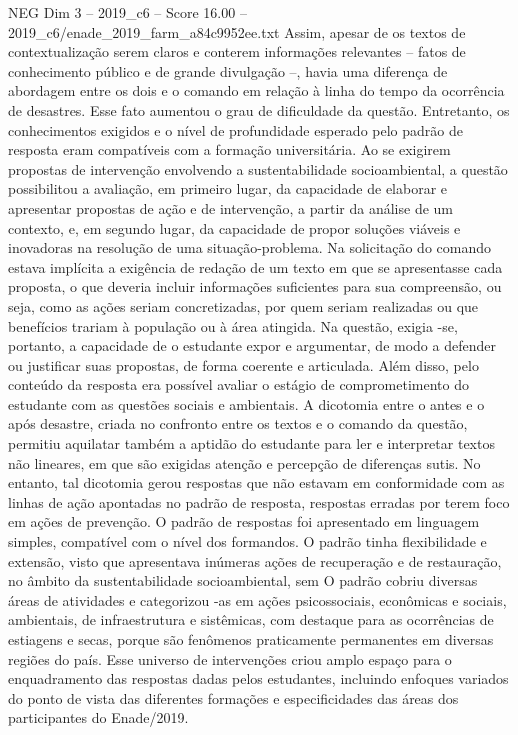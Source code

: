 \begin{textsample}{NEG Dim 3 – 2019\_c6 – Score 16.00 – 2019\_c6/enade\_2019\_farm\_a84c9952ee.txt}
Assim, apesar de os textos de contextualização serem claros e conterem informações relevantes – fatos de conhecimento público e de grande divulgação –, havia uma diferença de abordagem entre os dois e o comando em relação à linha do tempo da ocorrência de desastres.
Esse fato aumentou o grau de dificuldade da questão.
Entretanto, os conhecimentos exigidos e o nível de profundidade esperado pelo padrão de resposta eram compatíveis com a formação universitária.
Ao se exigirem propostas de intervenção envolvendo a sustentabilidade socioambiental, a questão possibilitou a avaliação, em primeiro lugar, da capacidade de elaborar e apresentar propostas de ação e de intervenção, a partir da análise de um contexto, e, em segundo lugar, da capacidade de propor soluções viáveis e inovadoras na resolução de uma situação-problema.
Na solicitação do comando estava implícita a exigência de redação de um texto em que se apresentasse cada proposta, o que deveria incluir informações suficientes para sua compreensão, ou seja, como as ações seriam concretizadas, por quem seriam realizadas ou que benefícios trariam à população ou à área atingida.
Na questão, exigia -se, portanto, a capacidade de o estudante expor e argumentar, de modo a defender ou justificar suas propostas, de forma coerente e articulada.
Além disso, pelo conteúdo da resposta era possível avaliar o estágio de comprometimento do estudante com as questões sociais e ambientais.
A dicotomia entre o antes e o após desastre, criada no confronto entre os textos e o comando da questão, permitiu aquilatar também a aptidão do estudante para ler e interpretar textos não lineares, em que são exigidas atenção e percepção de diferenças sutis.
No entanto, tal dicotomia gerou respostas que não estavam em conformidade com as linhas de ação apontadas no padrão de resposta, respostas erradas por terem foco em ações de prevenção.
O padrão de respostas foi apresentado em linguagem simples, compatível com o nível dos formandos.
O padrão tinha flexibilidade e extensão, visto que apresentava inúmeras ações de recuperação e de restauração, no âmbito da sustentabilidade socioambiental, sem O padrão cobriu diversas áreas de atividades e categorizou -as em ações psicossociais, econômicas e sociais, ambientais, de infraestrutura e sistêmicas, com destaque para as ocorrências de estiagens e secas, porque são fenômenos praticamente permanentes em diversas regiões do país.
Esse universo de intervenções criou amplo espaço para o enquadramento das respostas dadas pelos estudantes, incluindo enfoques variados do ponto de vista das diferentes formações e especificidades das áreas dos participantes do Enade/2019.

\end{textsample}
